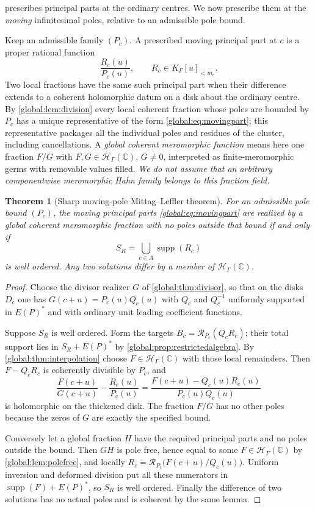 \documentclass[11pt,letterpaper]{article}
\newtheorem{theorem}{Theorem}[section]
\theoremstyle{definition}
\theoremstyle{remark}
\newcommand{\C}{\mathbb C}
\newcommand{\HH}{\mathscr H_\Gamma}
\newcommand{\KK}{K_\Gamma}
\newcommand{\supp}{\operatorname{supp}}
\newcommand{\jet}{\mathcal R}
\numberwithin{equation}{section}
\begin{document}
 prescribes principal parts at the ordinary centres. We now prescribe them at the \emph{moving} infinitesimal poles, relative to an admissible pole bound.

Keep an admissible family $(P_c)$. A prescribed moving principal part at $c$ is a proper rational function
\begin{equation}\label{global:eq:movingpart}
  \frac{R_c(u)}{P_c(u)},\qquad R_c\in\KK[u]_{<m_c}.
\end{equation}
Two local fractions have the same such principal part when their difference extends to a coherent holomorphic datum on a disk about the ordinary centre. By \cref{global:lem:division} every local coherent fraction whose poles are bounded by $P_c$ has a unique representative of the form \eqref{global:eq:movingpart}; this representative packages all the individual poles and residues of the cluster, including cancellations. A \emph{global coherent meromorphic function} means here one fraction $F/G$ with $F,G\in\HH(\C)$, $G\ne0$, interpreted as finite-meromorphic germs with removable values filled. \emph{We do not assume that an arbitrary componentwise meromorphic Hahn family belongs to this fraction field.}

\begin{theorem}[Sharp moving-pole Mittag--Leffler theorem]\label{global:thm:MLmoving}
For an admissible pole bound $(P_c)$, the moving principal parts \eqref{global:eq:movingpart} are realized by a global coherent meromorphic fraction with no poles outside that bound if and only if
\begin{equation}\label{global:eq:MLsupport}
  S_R=\bigcup_{c\in A}\supp(R_c)
\end{equation}
is well ordered. Any two solutions differ by a member of $\HH(\C)$.
\end{theorem}

\begin{proof}
Choose the divisor realizer $G$ of \cref{global:thm:divisor}, so that on the disks $D_c$ one has $G(c+u)=P_c(u)Q_c(u)$ with $Q_c$ and $Q_c^{-1}$ uniformly supported in $E(P)^*$ and with ordinary unit leading coefficient functions.

Suppose $S_R$ is well ordered. Form the targets $B_c=\jet_{P_c}(Q_cR_c)$; their total support lies in $S_R+E(P)^*$ by \cref{global:prop:restrictedalgebra}. By \cref{global:thm:interpolation} choose $F\in\HH(\C)$ with those local remainders. Then $F-Q_cR_c$ is coherently divisible by $P_c$, and
\[
  \frac{F(c+u)}{G(c+u)}-\frac{R_c(u)}{P_c(u)}
  =\frac{F(c+u)-Q_c(u)R_c(u)}{P_c(u)Q_c(u)}
\]
is holomorphic on the thickened disk. The fraction $F/G$ has no other poles because the zeros of $G$ are exactly the specified bound.

Conversely let a global fraction $H$ have the required principal parts and no poles outside the bound. Then $GH$ is pole free, hence equal to some $F\in\HH(\C)$ by \cref{global:lem:polefree}, and locally $R_c=\jet_{P_c}\bigl(F(c+u)/Q_c(u)\bigr)$. Uniform inversion and deformed division put all these numerators in $\supp(F)+E(P)^*$, so $S_R$ is well ordered. Finally the difference of two solutions has no actual poles and is coherent by the same lemma.
\end{proof}
\end{document}
